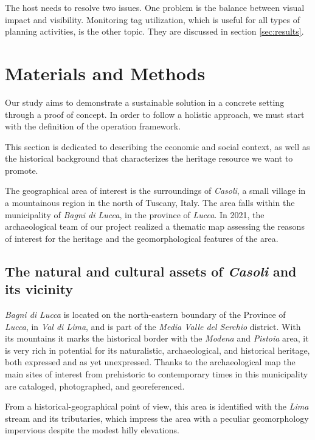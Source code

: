 \documentclass[sustainability,article,submit,pdftex,moreauthors]{Definitions/mdpi}
\begin{document}
The host needs to resolve two issues. One problem is the balance between visual impact and visibility. Monitoring tag utilization, which is useful for all types of planning activities, is the other topic. They are discussed in section \ref{sec:results}.

\section{Materials and Methods \label{sec:methods}}

Our study aims to demonstrate a sustainable solution in a concrete setting through a proof of concept. In order to follow a holistic approach, we must start with the definition of the operation framework.

This section is dedicated to describing the economic and social context, as well as the historical background that characterizes the heritage resource we want to promote.

The geographical area of interest is the surroundings of \emph{Casoli}, a small village in a mountainous region in the north of Tuscany, Italy. The area falls within the municipality of \emph{Bagni di Lucca}, in the province of \emph{Lucca}. In 2021, the archaeological team of our project realized a thematic map assessing the reasons of interest for the heritage and the geomorphological features of the area.

\subsection{The natural and cultural assets of \emph{Casoli} and its vicinity \label{sec:legacy}}

\emph{Bagni di Lucca} is located on the north-eastern boundary of the Province of \emph{Lucca}, in \emph{Val di Lima}, and is part of the \textit{Media Valle del Serchio} district. With its mountains it marks the historical border with the \textit{Modena} and \textit{Pistoia} area, it is very rich in potential for its naturalistic, archaeological, and historical heritage, both expressed and as yet unexpressed. Thanks to the archaeological map the main sites of interest from prehistoric to contemporary times in this municipality are cataloged, photographed, and georeferenced.

From a historical-geographical point of view, this area is identified with the \emph{Lima} stream and its tributaries, which impress the area with a peculiar geomorphology impervious despite the modest hilly elevations.
\end{document}
